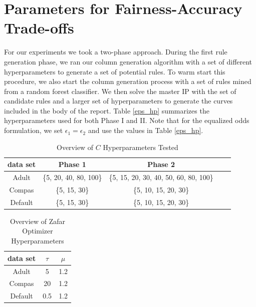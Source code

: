 \documentclass[twoside,11pt]{article}
\begin{document}
\section{Parameters for Fairness-Accuracy Trade-offs} \label{app:params_fairness}

For our experiments we took a two-phase approach. During the first rule generation phase, we ran our column generation algorithm with a set of different hyperparameters to generate a set of potential rules. To warm start this procedure, we also start the column generation process with a set of rules mined from a random forest classifier. We then solve the master IP with the set of candidate rules and a larger set of hyperparameters to generate the curves included in the body of the report. Table \ref{eps_hp} summarizes the hyperparameters used for both Phase I and II. Note that for the equalized odds formulation, we set $\epsilon_1 = \epsilon_2$ and use the values in Table \ref{eps_hp}.


\begin{table}[hbt]
\centering
\caption{\label{c_hp} Overview of $C$ Hyperparameters Tested}
\setlength{\tabcolsep}{5pt} %
\begin{tabular}{c c c c c}		\toprule
data set & Phase 1 & Phase 2  \\ \midrule 
Adult &\{5, 20, 40, 80, 100\}  & \{5, 15, 20, 30, 40, 50, 60, 80, 100\} \\
Compas &\{5, 15, 30\}  & \{5, 10, 15, 20, 30\} \\
Default &\{5, 15, 30\}  & \{5, 10, 15, 20, 30\} \\
\bottomrule
\end{tabular}%
\end{table}%

\begin{table}[hbt]
\centering

\caption{\label{zafar_hp} Overview of Zafar Optimizer Hyperparameters}
\footnotesize
\setlength{\tabcolsep}{5pt} %
\begin{tabular}{c c c}		\toprule
data set & $\tau$ & $\mu$  \\ \midrule 
Adult & 5 & 1.2\\
Compas &20  & 1.2\\
Default & 0.5 & 1.2 \\
\bottomrule
\end{tabular}%
\end{table}%
\end{document}

